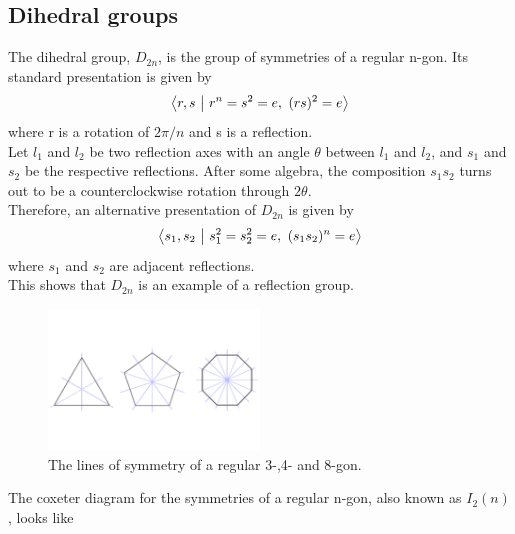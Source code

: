 \documentclass[../main.tex]{subfiles}
\begin{document}
\subsection{Dihedral groups}

The dihedral group, $D_{2n}$, is the group of symmetries of a regular n-gon. Its standard presentation is given by
\[
\left\langle r,s \ \middle| \  r^n = s^2 = e, \ (rs)^2 = e \right\rangle
\]
where r is a rotation of $2\pi/n$ and s is a reflection.\\

Let $l_{1}$ and $l_{2}$ be two reflection axes with an angle $\theta$ between $l_{1}$ and $l_{2}$, and $s_{1}$ and $s_{2}$ be the respective reflections. After some algebra, the composition $s_{1}s_{2}$ turns out to be a counterclockwise rotation through $2\theta$.\\

Therefore, an alternative presentation of $D_{2n}$ is given by
\[
\left\langle s_1,s_2 \ \middle| \ s_1^2 = s_2^2 = e, \ (s_1s_2)^n = e \right\rangle
\]
where $s_{1}$ and $s_{2}$ are adjacent reflections.\\

This shows that $D_{2n}$ is an example of a reflection group.

\begin{figure}[ht]
    \centering
    \includegraphics[width=0.5\textwidth]{polygons.pdf}
    \caption{The lines of symmetry of a regular 3-,4- and 8-gon.}
    \label{}
\end{figure}

\begin{example}
The coxeter diagram for the symmetries of a regular n-gon, also known as $I_{2}(n)$, looks like
    \begin{figure}[H]
    \centering

\end{figure}
\end{example}
\end{document}
